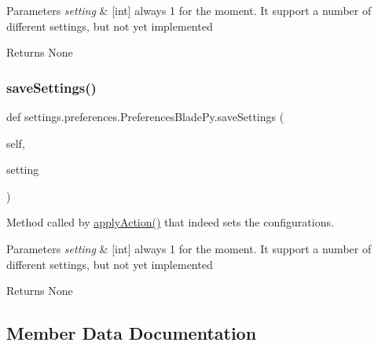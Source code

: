 \begin{DoxyParams}{Parameters}
{\em setting} & \mbox{[}int\mbox{]} always 1 for the moment. It support a number of different settings, but not yet implemented \\
\hline
\end{DoxyParams}
\begin{DoxyReturn}{Returns}
None 
\end{DoxyReturn}
\hypertarget{classsettings_1_1preferences_1_1_preferences_blade_py_a9cfbfd7abab4ba14d80c573a0534040b}{}\label{classsettings_1_1preferences_1_1_preferences_blade_py_a9cfbfd7abab4ba14d80c573a0534040b} 
\subsubsection{\texorpdfstring{save\+Settings()}{saveSettings()}}
{\footnotesize\ttfamily def settings.\+preferences.\+Preferences\+Blade\+Py.\+save\+Settings (\begin{DoxyParamCaption}\item[{}]{self,  }\item[{}]{setting }\end{DoxyParamCaption})}



Method called by \hyperlink{classsettings_1_1preferences_1_1_preferences_blade_py_a8938a7b43ca7c5496a0ae7bf8d6a0c54}{apply\+Action()} that indeed sets the configurations. 


\begin{DoxyParams}{Parameters}
{\em setting} & \mbox{[}int\mbox{]} always 1 for the moment. It support a number of different settings, but not yet implemented \\
\hline
\end{DoxyParams}
\begin{DoxyReturn}{Returns}
None 
\end{DoxyReturn}


\subsection{Member Data Documentation}
\hypertarget{classsettings_1_1preferences_1_1_preferences_blade_py_a8904394496c57e265ab1cf0346b025d9}{}\label{classsettings_1_1preferences_1_1_preferences_blade_py_a8904394496c57e265ab1cf0346b025d9} 

